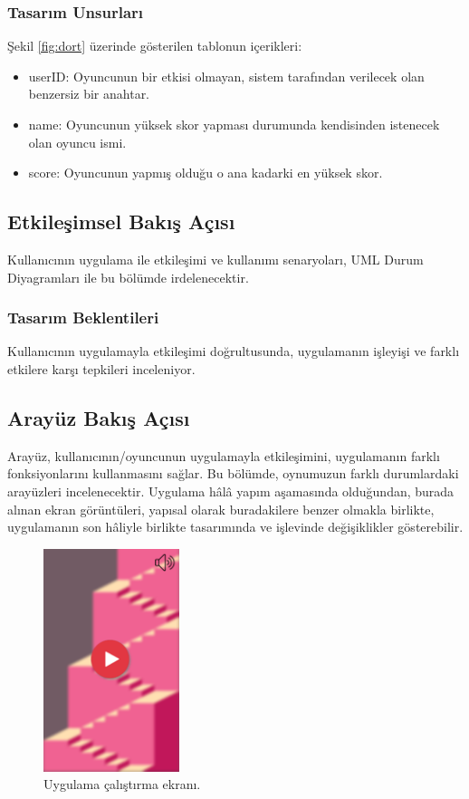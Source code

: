 \documentclass[12pt,a4paper]{article}
\begin{document}
   \subsubsection{Tasarım Unsurları}
   Şekil \ref{fig:dort} üzerinde gösterilen tablonun içerikleri:
   \begin{itemize}
      \item userID: Oyuncunun bir etkisi olmayan, sistem tarafından verilecek olan benzersiz bir anahtar.
      \item name: Oyuncunun yüksek skor yapması durumunda kendisinden istenecek olan oyuncu ismi.
      \item score: Oyuncunun yapmış olduğu o ana kadarki en yüksek skor.
   \end{itemize}

   \subsection{Etkileşimsel Bakış Açısı}
   Kullanıcının uygulama ile etkileşimi ve kullanımı senaryoları, UML Durum Diyagramları ile bu bölümde irdelenecektir.

   \subsubsection{Tasarım Beklentileri}
   Kullanıcının uygulamayla etkileşimi doğrultusunda, uygulamanın işleyişi ve farklı etkilere karşı tepkileri inceleniyor.

   \subsection{Arayüz Bakış Açısı}
   Arayüz, kullanıcının/oyuncunun uygulamayla etkileşimini, uygulamanın farklı fonksiyonlarını kullanmasını sağlar. Bu bölümde, oynumuzun farklı durumlardaki arayüzleri incelenecektir. Uygulama hâlâ yapım aşamasında olduğundan, burada alınan ekran görüntüleri, yapısal olarak buradakilere benzer olmakla birlikte, uygulamanın son hâliyle birlikte tasarımında ve işlevinde değişiklikler gösterebilir.

   \begin{figure}
      \begin{center}
         \includegraphics[width=150px]{img/img7}
         \caption{Uygulama çalıştırma ekranı.}
         \label{fig:yedi}
      \end{center}
   \end{figure}
\end{document}
